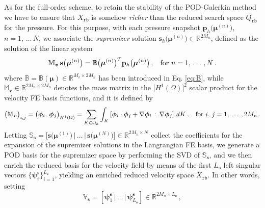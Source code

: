 \documentclass[12pt, a4paper, twoside, openright, notitlepage]{report}
\numberwithin{equation}{chapter}
\theoremstyle{theorem}
\theoremstyle{definition}
\theoremstyle{remark}
\theoremstyle{proposition}
\numberwithin{figure}{chapter}
\newcommand{\bg}[1]{\boldsymbol{#1}}
\begin{document}
		As for the full-order scheme, to retain the stability of the POD-Galerkin method we have to ensure that $X_{\texttt{rb}}$ is somehow \emph{richer} than the reduced search space $Q_{\texttt{rb}}$ for the pressure. For this purpose, with each pressure snapshot $\mathbf{p}_h \big( \bg{\mu}^{(n)} \big)$, $n = 1, \, \ldots \, N$, we associate the \emph{supremizer} solution $\mathbf{s}_h \big( \bg{\mu}^{(n)} \big) \in \mathbb{R}^{2 M_n}$, defined as the solution of the linear system
		\begin{equation}
			\label{eq:supremizer-system}
			\mathbb{M}_{\bg{v}} \, \mathbf{s} \big( \bg{\mu}^{(n)} \big) = \mathbb{B} \big( \bg{\mu}^{(n)} \big)^T \mathbf{p}_h \big( \bg{\mu}^{(n)} \big) \, , \hspace*{0.3cm} \text{for $n = 1, \, \ldots \, , N$} \, .
		\end{equation} 
		where $\mathbb{B} = \mathbb{B}(\bg{\mu}) \in \mathbb{R}^{M_v \times 2 M_n}$ has been introduced in Eq. \eqref{eq:B}, while $\mathbb{M}_{\bg{v}} \in \mathbb{R}^{2 M_n \times 2 M_n}$ denotes the mass matrix in the $\big[ H^1(\Omega) \big]^2$ scalar product for the velocity FE basis functions, and it is defined by
		\begin{equation*}
			\big( \mathbb{M}_{\bg{v}} \big)_{i,j} = \big( \bg{\phi}_i, \, \bg{\phi}_j \big)_{H^1(\Omega)} = \sum_{K \in \Omega_h} \int_K \left[ \bg{\phi}_i \cdot \bg{\phi}_j + \nabla \bg{\phi}_i \, : \, \nabla \bg{\phi}_j \right] \, dK \, , \hspace*{0.3cm} \text{for $i, \, j = 1, \, \ldots \, , 2 M_n$} \, .
		\end{equation*}
		Letting $\mathbb{S}_{\bg{s}} = \big[ \mathbf{s} \big( \bg{\mu}^{(1)} \big) \, \big| \, \ldots \, \big| \, \mathbf{s} \big( \bg{\mu}^{(N)} \big) \big] \in \mathbb{R}^{2 M_n \times N}$ collect the coefficients for the expansion of the supremizer solutions in the Langrangian FE basis, we generate a POD basis for the supremizer space by performing the SVD of $\mathbb{S}_{\bg{s}}$, and we then enrich the reduced basis for the velocity field by means of the first $L_{\bg{s}}$ left singular vectors $\big\lbrace \bg{\psi}_i^{\bg{s}} \big\rbrace_{i = 1}^{L_{\bg{s}}}$, yielding an enriched reduced velocity space $\bar{X}_{\texttt{rb}}$. In other words, setting
		\begin{equation*}
			\mathbb{V}_{\bg{s}} = \left[ \bg{\psi}_1^{\bg{s}} \, \big| \, \ldots \, \big| \, \bg{\psi}_{L_{\bg{s}}}^{\bg{s}} \right] \in \mathbb{R}^{2 M_n \times L_{\bg{s}}} \, ,
		\end{equation*}
\end{document}
